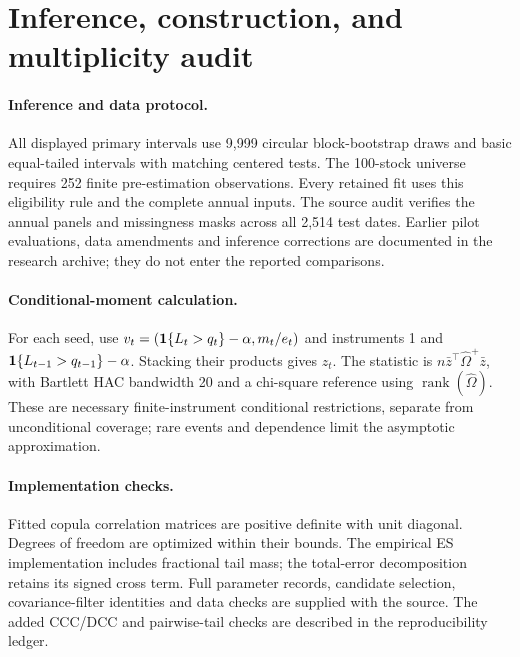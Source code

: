 \documentclass[11pt]{article}
\theoremstyle{definition}\newtheorem{definition}[theorem]{Definition}
\theoremstyle{remark}\newtheorem{remark}[theorem]{Remark}
\begin{document}
\section{Inference, construction, and multiplicity audit}
\paragraph{Inference and data protocol.}
All displayed primary intervals use 9,999 circular block-bootstrap draws and basic equal-tailed intervals with matching centered tests. The 100-stock universe requires 252 finite pre-estimation observations. Every retained fit uses this eligibility rule and the complete annual inputs. The source audit verifies the annual panels and missingness masks across all 2,514 test dates. Earlier pilot evaluations, data amendments and inference corrections are documented in the research archive; they do not enter the reported comparisons.

\paragraph{Conditional-moment calculation.}
For each seed, use $v_t=(\mathbf 1\{L_t>q_t\}-\alpha,m_t/e_t)$ and instruments 1 and $\mathbf 1\{L_{t-1}>q_{t-1}\}-\alpha$. Stacking their products gives $z_t$. The statistic is $n\bar z^\top\widehat\Omega^+\bar z$, with Bartlett HAC bandwidth 20 and a chi-square reference using $\operatorname{rank}(\widehat\Omega)$. These are necessary finite-instrument conditional restrictions, separate from unconditional coverage; rare events and dependence limit the asymptotic approximation.

\paragraph{Implementation checks.}
Fitted copula correlation matrices are positive definite with unit diagonal. Degrees of freedom are optimized within their bounds. The empirical ES implementation includes fractional tail mass; the total-error decomposition retains its signed cross term. Full parameter records, candidate selection, covariance-filter identities and data checks are supplied with the source. The added CCC/DCC and pairwise-tail checks are described in the reproducibility ledger.
\end{document}
